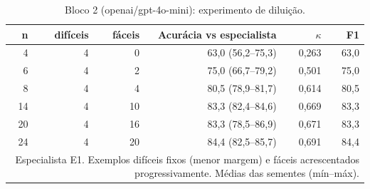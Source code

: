 \begin{table}[htbp]
\centering
\small
\caption{Bloco 2 (openai/gpt-4o-mini): experimento de diluição.}
\label{tab:bloco2_E1_diluicao_gpt4mini}
\begin{tabular}{rrrrrr}
\toprule
n & difíceis & fáceis & Acurácia vs especialista & $\kappa$ & F1 \\
\midrule
4 & 4 & 0 & 63,0 (56,2–75,3) & 0,263 & 63,0 \\
6 & 4 & 2 & 75,0 (66,7–79,2) & 0,501 & 75,0 \\
8 & 4 & 4 & 80,5 (78,9–81,7) & 0,614 & 80,5 \\
14 & 4 & 10 & 83,3 (82,4–84,6) & 0,669 & 83,3 \\
20 & 4 & 16 & 83,3 (78,5–86,9) & 0,671 & 83,3 \\
24 & 4 & 20 & 84,4 (82,5–85,7) & 0,691 & 84,4 \\
\bottomrule
\multicolumn{6}{p{0.95\linewidth}}{\footnotesize Especialista E1. Exemplos difíceis fixos (menor margem) e fáceis acrescentados progressivamente. Médias das sementes (mín–máx).} \\
\end{tabular}
\end{table}
